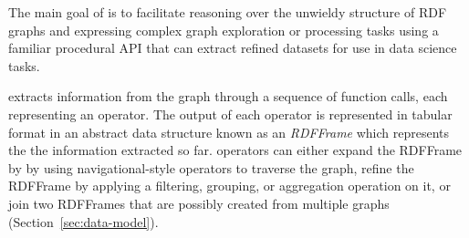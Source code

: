 The main goal of \rdfframes is to facilitate reasoning over the unwieldy structure of RDF graphs and expressing complex graph exploration or processing tasks using a familiar procedural API that can extract refined datasets for use in data science tasks. 


 
\rdfframes extracts information from the graph through a sequence of function calls, each representing an \rdfframes operator.
The output of each operator is represented in tabular format in an abstract data structure known as an {\em RDFFrame} which represents the the information extracted so far.
\rdfframes operators can either expand the RDFFrame by by using navigational-style operators to traverse the graph, refine the RDFFrame by applying a filtering, grouping, or aggregation operation on it, or join two RDFFrames that are possibly created from multiple graphs (Section~\ref{sec:data-model}).


